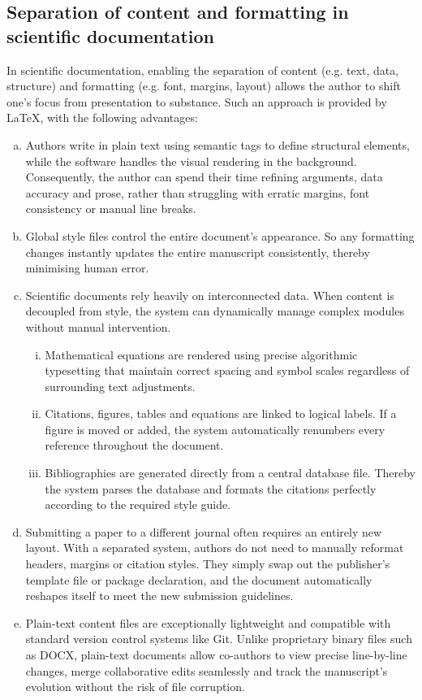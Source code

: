 	\subsection{Separation of content and formatting in scientific documentation}
		In scientific documentation, enabling the separation of content (e.g. text, data, structure) and formatting (e.g. font, margins, layout) allows the author to shift one's focus from presentation to substance. Such an approach is provided by \LaTeX, with the following advantages:
		\begin{enumerate}[a)]
			\item Authors write in plain text using semantic tags to define structural elements, while the software handles the visual rendering in the background. Consequently, the author can spend their time refining arguments, data accuracy and prose, rather than struggling with erratic margins, font consistency or manual line breaks.
			\item Global style files control the entire document's appearance. So any formatting changes instantly updates the entire manuscript consistently, thereby minimising human error.
			\item Scientific documents rely heavily on interconnected data. When content is decoupled from style, the system can dynamically manage complex modules without manual intervention.
			\begin{enumerate}[i.]
				\item Mathematical equations are rendered using precise algorithmic typesetting that maintain correct spacing and symbol scales regardless of surrounding text adjustments.
				\item Citations, figures, tables and equations are linked to logical labels. If a figure is moved or added, the system automatically renumbers every reference throughout the document.
				\item Bibliographies are generated directly from a central database file. Thereby the system parses the database and formats the citations perfectly according to the required style guide.
			\end{enumerate}
			\item Submitting a paper to a different journal often requires an entirely new layout. With a separated system, authors do not need to manually reformat headers, margins or citation styles. They simply swap out the publisher's template file or package declaration, and the document automatically reshapes itself to meet the new submission guidelines.
			\item Plain-text content files are exceptionally lightweight and compatible with standard version control systems like Git. Unlike proprietary binary files such as DOCX, plain-text documents allow co-authors to view precise line-by-line changes, merge collaborative edits seamlessly and track the manuscript's evolution without the risk of file corruption.
		\end{enumerate}
		
